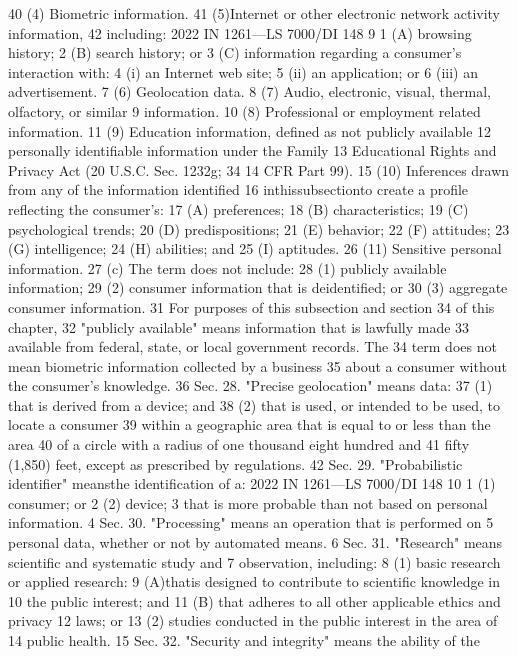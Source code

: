 40 (4) Biometric information.
41 (5)Internet or other electronic network activity information,
42 including:
2022 IN 1261—LS 7000/DI 148
9
1 (A) browsing history;
2 (B) search history; or
3 (C) information regarding a consumer's interaction with:
4 (i) an Internet web site;
5 (ii) an application; or
6 (iii) an advertisement.
7 (6) Geolocation data.
8 (7) Audio, electronic, visual, thermal, olfactory, or similar
9 information.
10 (8) Professional or employment related information.
11 (9) Education information, defined as not publicly available
12 personally identifiable information under the Family
13 Educational Rights and Privacy Act (20 U.S.C. Sec. 1232g; 34
14 CFR Part 99).
15 (10) Inferences drawn from any of the information identified
16 inthissubsectionto create a profile reflecting the consumer's:
17 (A) preferences;
18 (B) characteristics;
19 (C) psychological trends;
20 (D) predispositions;
21 (E) behavior;
22 (F) attitudes;
23 (G) intelligence;
24 (H) abilities; and
25 (I) aptitudes.
26 (11) Sensitive personal information.
27 (c) The term does not include:
28 (1) publicly available information;
29 (2) consumer information that is deidentified; or
30 (3) aggregate consumer information.
31 For purposes of this subsection and section 34 of this chapter,
32 "publicly available" means information that is lawfully made
33 available from federal, state, or local government records. The
34 term does not mean biometric information collected by a business
35 about a consumer without the consumer's knowledge.
36 Sec. 28. "Precise geolocation" means data:
37 (1) that is derived from a device; and
38 (2) that is used, or intended to be used, to locate a consumer
39 within a geographic area that is equal to or less than the area
40 of a circle with a radius of one thousand eight hundred and
41 fifty (1,850) feet, except as prescribed by regulations.
42 Sec. 29. "Probabilistic identifier" meansthe identification of a:
2022 IN 1261—LS 7000/DI 148
10
1 (1) consumer; or
2 (2) device;
3 that is more probable than not based on personal information.
4 Sec. 30. "Processing" means an operation that is performed on
5 personal data, whether or not by automated means.
6 Sec. 31. "Research" means scientific and systematic study and
7 observation, including:
8 (1) basic research or applied research:
9 (A)thatis designed to contribute to scientific knowledge in
10 the public interest; and
11 (B) that adheres to all other applicable ethics and privacy
12 laws; or
13 (2) studies conducted in the public interest in the area of
14 public health.
15 Sec. 32. "Security and integrity" means the ability of the
